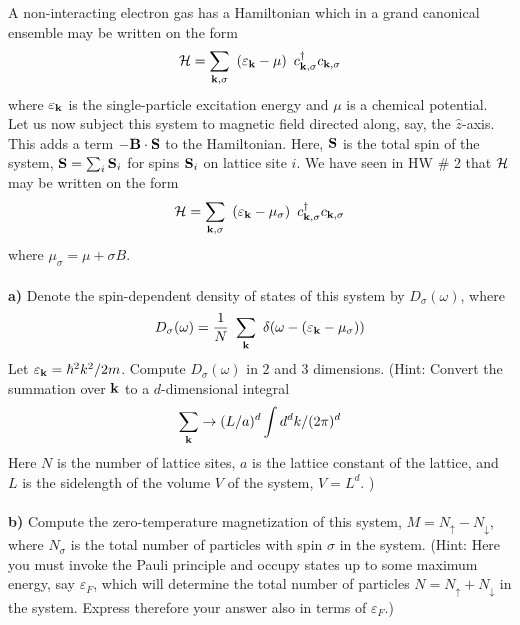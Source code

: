 \begin{problem}
	
	A non-interacting electron gas has a Hamiltonian which in a grand canonical ensemble may be written on the form
	\begin{eqnarray}
		\mathcal{H} = \sum_{{\bf k},\sigma} ~ \left( \varepsilon_{{\bf k}} - \mu \right) ~ c^{\dagger}_{{\bf k}, \sigma}    c_{{\bf k}, \sigma}   \nonumber
	\end{eqnarray}
	where $\varepsilon_{{\bf k}}$ is the single-particle excitation energy and $\mu$ is a chemical potential. Let us now subject this system to magnetic field directed along, say, the $\hat z$-axis. This adds a term $- {\bf B}\cdot {\bf S}$ to the Hamiltonian. Here, ${\bf S}$ is the total spin of the system, ${\bf S} = \sum_i {\bf S}_i$ for spins ${\bf S}_i$ on lattice site $i$. 
	We have seen in HW $\#$ 2 that  $\mathcal{H}$ may be written on the form
	\begin{eqnarray}
		\mathcal{H} = \sum_{{\bf k},\sigma} ~ \left( \varepsilon_{{\bf k}} - \mu_\sigma \right) ~ c^{\dagger}_{{\bf k}, \sigma}    c_{{\bf k}, \sigma}   \nonumber
	\end{eqnarray}
	where $\mu_\sigma = \mu + \sigma B$.
	\ \\
	\ \\
	{\bf a)} Denote the spin-dependent density of states of this system by $D_\sigma(\omega)$, where
	\begin{eqnarray}
		D_\sigma(\omega) = \frac{1}{N} ~ \sum_{{\bf k}} ~\delta(\omega -( \varepsilon_{{\bf k}} - \mu_\sigma  )) \nonumber
	\end{eqnarray} 
	Let $\varepsilon_{{\bf k}} = \hbar^2 k^2/2m$. Compute $D_\sigma(\omega)$ in $2$ and $3$ dimensions. (Hint: Convert the summation over ${\bf k}$ to a $d$-dimensional integral 
	$$ \sum_{{\bf k}} \to (L/a)^d \int d^d k/(2\pi)^d$$ 
	Here $N$ is the number of lattice sites, $a$ is the lattice constant of the lattice, and $L$ is the sidelength of the volume $V$ of the system, $V=L^d$. )  
	\ \\
	\ \\
	{\bf b)} Compute the zero-temperature magnetization of this system, $M = N_{\uparrow}- N_{\downarrow}$, where $N_\sigma$ is the total number of particles with spin $\sigma$ in the system. (Hint: Here you must invoke the Pauli principle and occupy states up to some maximum energy, say $\varepsilon_F$, which will determine the total number of particles $N=N_{\uparrow}+ N_{\downarrow}$ in the system. Express therefore your answer also in terms of $\varepsilon_F$.)
\end{problem}
